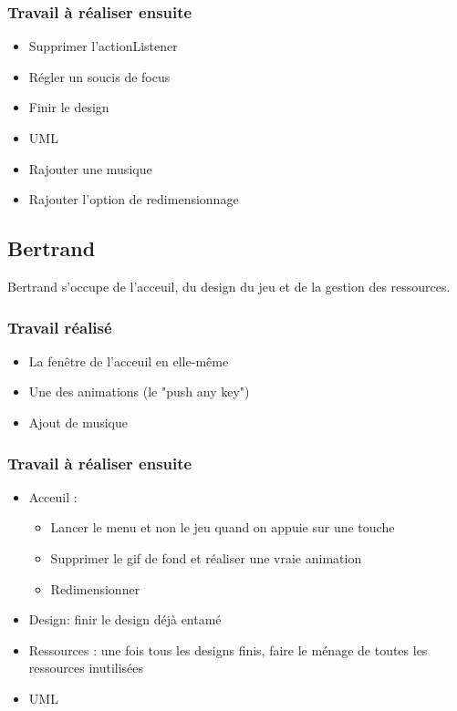 \documentclass[a4paper,utf8]{article}
\begin{document}
		\subsubsection{Travail \`a r\'ealiser ensuite}
			\begin{itemize}
				\item Supprimer l'actionListener
				\item R\'egler un soucis de focus
				\item Finir le design
				\item UML
				\item Rajouter une musique
				\item Rajouter l'option de redimensionnage 
			\end{itemize}
	\subsection{Bertrand}
		Bertrand s'occupe de l'acceuil, du design du jeu et de la gestion des ressources.
		\subsubsection{Travail r\'ealis\'e}
			\begin{itemize}
				\item La fen\^{e}tre de l'acceuil en elle-m\^{e}me
				\item Une des animations (le "push any key")
				\item Ajout de musique
			\end{itemize}
		\subsubsection{Travail \`a r\'ealiser ensuite}
			\begin{itemize}
				\item Acceuil :
					\begin{itemize}
						\item Lancer le menu et non le jeu quand on appuie sur une touche
						\item Supprimer le gif de fond et r\'ealiser une vraie animation
						\item Redimensionner
					\end{itemize}
				\item Design: finir le design d\'ej\`a entam\'e
				\item Ressources : une fois tous les designs finis, faire le m\'enage de toutes les ressources inutilis\'ees
				\item UML
			\end{itemize}
\end{document}

